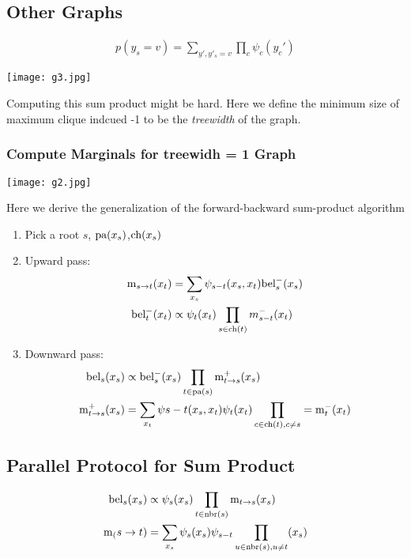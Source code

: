 \documentclass{article}
\begin{document}
\subsection{Other Graphs}
\begin{align*}
p(y_s = v) = \sum_{y',y'_s=v}\prod_c\psi_c(y_c')
\end{align*}
\begin{center}
\texttt{[image: g3.jpg]}
\end{center}
Computing this sum product might be hard. Here we define the minimum size of maximum clique indcued -1 to be the \textit{treewidth} of the graph.
\subsubsection{Compute Marginals for treewidh = 1 Graph}
\begin{center}
\texttt{[image: g2.jpg]}
\end{center}
Here we derive the generalization of the forward-backward sum-product algorithm
\begin{enumerate}
\item Pick a root  $s$, $\text{pa}(x_s)$,$\text{ch}(x_s)$
\item Upward pass:
\begin{align*}
\text{m}_{s\rightarrow t}(x_t)&=\sum_{x_s}\psi_{s-t}(x_s,x_t)\text{bel}_s^-(x_s)\\
\text{bel}_t^-(x_t)&\propto \psi_t(x_t)\prod_{s \in \text{ch}(t)} m_{s-t}^-(x_t)
\end{align*}
\item Downward pass:
\begin{align*}
\text{bel}_s(x_s)&\propto \text{bel}_s^-(x_s)\prod_{t \in \text{pa}(s)} \text{m}_{t\rightarrow s}^+(x_s) \\
\text{m}_{t\rightarrow s}^+ (x_s) &= \sum_{x_t} \psi{s-t}(x_s,x_t)\psi_t(x_t)\prod_{c \in \text{ch}(t), c \neq s}=\text{m}_t^-(x_t)
\end{align*}
\end{enumerate}

\subsection{Parallel Protocol for Sum Product}

\begin{align*}
\text{bel}_s(x_s)&\propto\psi_s(x_s)\prod_{t \in \text{nbr}(s)} \text{m}_{t\rightarrow s}(x_s)\\
\text{m}_(s\rightarrow t) &=\sum_{x_s}\psi_s(x_s)\psi_{s-t}\prod_{u \in \text{nbr}(s), u \neq t}(x_s)
\end{align*}
\end{document}
